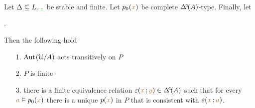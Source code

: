 \begin{theorem}\label{thm_FER}
  Let $\Delta\subseteq L_{{\color{brown} x}\,{\color{green} z}}$ be stable and finite.
  Let $p_0({\color{brown} x})$ be complete $\GDelta(A)$-type.
  Finally, let 
  
  .
  
  Then the following hold
  \begin{itemize}
    \item [1.] ${\rm Aut\kern.15ex}(\EuScript U/A)$ acts transitively on $P$
    \item [2.] $P$ is finite
    
    \item [3.] there is a finite equivalence relation $\epsilon({\mr x}\,;{\mr y})\in\GDelta(A)$ such that for every ${\color{brown} a}\vDash p_0({\color{brown} x})$ there is a unique $p({\color{brown} x})$ in $P$ that is consistent with $\varepsilon({\color{brown} x}\,;{\color{brown} a})$.
  \end{itemize}
\end{theorem}

